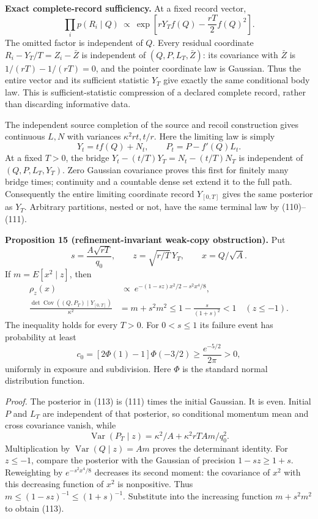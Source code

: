 \documentclass[11pt,a4paper]{article}
\begin{document}
\textbf{Exact complete-record sufficiency.} At a fixed record vector,
\[\prod_i p(R_i\mid Q)\ \propto\
 \exp\left[rY_Tf(Q)-\frac{rT}{2}f(Q)^2\right].\tag{111}\] The omitted
factor is independent of \(Q\). Every residual coordinate
\(R_i-Y_T/T=Z_i-\bar Z\) is independent of \((Q,P,L_T,\bar Z)\): its
covariance with \(\bar Z\) is \(1/(rT)-1/(rT)=0\), and the pointer
coordinate law is Gaussian. Thus the entire vector and its sufficient
statistic \(Y_T\) give exactly the same conditional body law. This is
sufficient-statistic compression of a declared complete record, rather
than discarding informative data.

The independent source completion of the source and recoil construction
gives continuous \(L,N\) with variances \(\kappa^2rt,t/r\). Here the
limiting law is simply
\[Y_t=t f(Q)+N_t,\qquad P_t=P-f'(Q)L_t.\tag{112}\] At a fixed \(T>0\),
the bridge \(Y_t-(t/T)Y_T=N_t-(t/T)N_T\) is independent of
\((Q,P,L_T,Y_T)\). Zero Gaussian covariance proves this first for
finitely many bridge times; continuity and a countable dense set extend
it to the full path. Consequently the entire limiting coordinate record
\(Y_{[0,T]}\) gives the same posterior as \(Y_T\). Arbitrary partitions,
nested or not, have the same terminal law by (110)--(111).

\textbf{Proposition 15 (refinement-invariant weak-copy obstruction).}
Put \[s=\frac{A\sqrt{rT}}{q_0},\qquad
z=\sqrt{r/T}\,Y_T,\qquad x=Q/\sqrt A.\] If \(m=E[x^2\mid z]\), then
\[\begin{aligned}
\rho_z(x)&\ \propto\
 e^{-(1-sz)x^2/2-s^2x^4/8},\\
\frac{\det\operatorname{Cov}((Q,P_T)\mid Y_{[0,T]})}{\kappa^2}
 &=m+s^2m^2
 \le1-\frac{s}{(1+s)^2}<1\quad(z\le-1).
\end{aligned}\tag{113}\] The inequality holds for every \(T>0\). For
\(0<s\le1\) its failure event has probability at least
\[c_0=[2\Phi(1)-1]\Phi(-3/2)
 \ge\frac{e^{-5/2}}{2\pi}>0,\tag{114}\] uniformly in exposure and
subdivision. Here \(\Phi\) is the standard normal distribution function.

\emph{Proof.} The posterior in (113) is (111) times the initial
Gaussian. It is even. Initial \(P\) and \(L_T\) are independent of that
posterior, so conditional momentum mean and cross covariance vanish,
while \[\operatorname{Var}(P_T\mid z)
=\kappa^2/A+\kappa^2rT A m/q_0^2.\] Multiplication by
\(\operatorname{Var}(Q\mid z)=Am\) proves the determinant identity. For
\(z\le-1\), compare the posterior with the Gaussian of precision
\(1-sz\ge1+s\). Reweighting by \(e^{-s^2x^4/8}\) decreases its second
moment: the covariance of \(x^2\) with this decreasing function of
\(x^2\) is nonpositive. Thus \(m\le(1-sz)^{-1}\le(1+s)^{-1}\).
Substitute into the increasing function \(m+s^2m^2\) to obtain (113).
\end{document}
